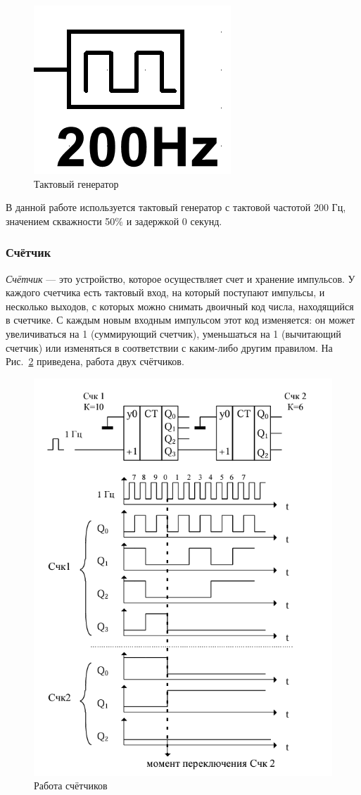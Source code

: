 \documentclass[a4paper, final]{article}
\begin{document}
\begin{figure}[H]
   \centering
   \includegraphics[scale=0.5]{clock.png}
   \caption{Тактовый генератор}
   \label{img:clock}
\end{figure}

В данной работе используется тактовый генератор с тактовой частотой 200 Гц, значением скважности 50\% и задержкой 0 секунд.

\subsubsection{Счётчик}
\textit{Счётчик} --- это устройство, которое осуществляет счет и хранение импульсов. У каждого счетчика есть тактовый вход, на который поступают импульсы, и несколько выходов, с которых можно снимать двоичный код числа, находящийся в счетчике. С каждым новым входным импульсом этот код изменяется: он может увеличиваться на 1 (суммирующий счетчик), уменьшаться на 1 (вычитающий счетчик) или изменяться в соответствии с каким-либо другим правилом. На Рис.~\ref{img:counters} приведена, работа двух счётчиков.

\begin{figure}[H]
   \centering
   \includegraphics[width=0.5\linewidth]{counters.png}
   \caption{Работа счётчиков}
   \label{img:counters}
\end{figure}
\end{document}
